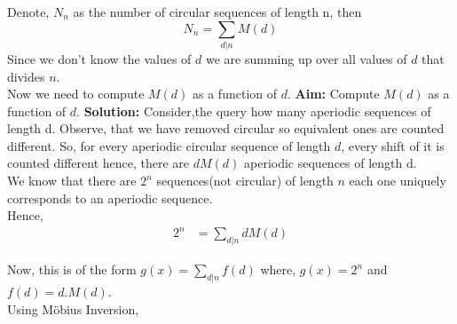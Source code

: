 Denote, $N_n$ as the number of circular sequences of length n, then \\ 
\begin{equation} \label{eq:circular seq}
    N_n = \sum_{d|n}M(d) 
\end{equation}
Since we don't know the values of $d$ we are summing up over all values of $d$ that divides $n$. \\
Now we need to compute $M(d)$ as a function of $d$.
\textbf{Aim:} Compute $M(d)$ as a function of $d$.
\textbf{Solution:} Consider,the query how many aperiodic sequences of length d. Observe, that we have removed circular so equivalent ones are counted different. So, for every aperiodic circular sequence of length $d$, every shift of it is counted different hence, there are $dM(d)$ aperiodic sequences of length d. \\
We know that there are $2^n$ sequences(not circular) of length $n$ each one uniquely corresponds to an aperiodic sequence.\\
Hence, 
\begin{align}
    2^n &= \sum_{d|n}dM(d) 
\end{align}

Now, this is of the form $g(x) = \sum_{d|n}f(d)$ where, $g(x) = 2^n$ and $f(d)=d.M(d)$. \\
Using Möbius Inversion, 

